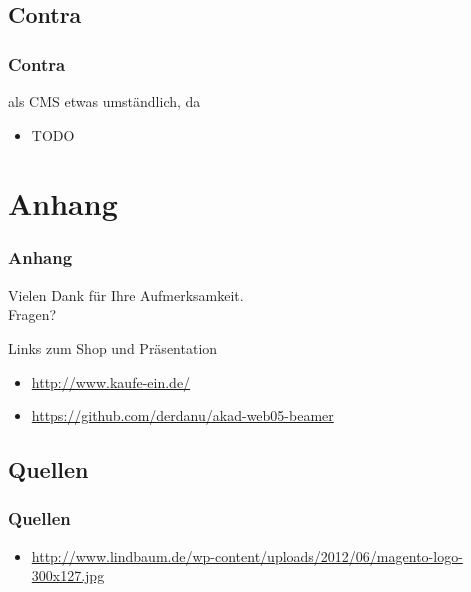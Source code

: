 \documentclass[xcolor=dvipsnames]{beamer}
\begin{document}
\subsection{Contra}
\begin{frame} %
  \frametitle{Contra} %
  \begin{alertblock}{als CMS etwas umständlich, da }
	  \begin{itemize}
		\item TODO
	  \end{itemize}
  \end{alertblock}
\end{frame}




\section{Anhang}
\begin{frame}
  \frametitle{Anhang} %
	\begin{block}{}	
		\begin{center}
			Vielen Dank für Ihre Aufmerksamkeit. \\
			Fragen?
		\end{center}	
	\end{block}
	\begin{block}{Links zum Shop und Präsentation}	
		\begin{itemize}
			\item \url{http://www.kaufe-ein.de/}					
			\item \url{https://github.com/derdanu/akad-web05-beamer}
		\end{itemize}
	\end{block}
\end{frame}

\subsection{Quellen}
\begin{frame} %
  \frametitle{Quellen} %
 	\begin{itemize}
			\item \url{http://www.lindbaum.de/wp-content/uploads/2012/06/magento-logo-300x127.jpg}	
	\end{itemize}
\end{frame}
\end{document}
